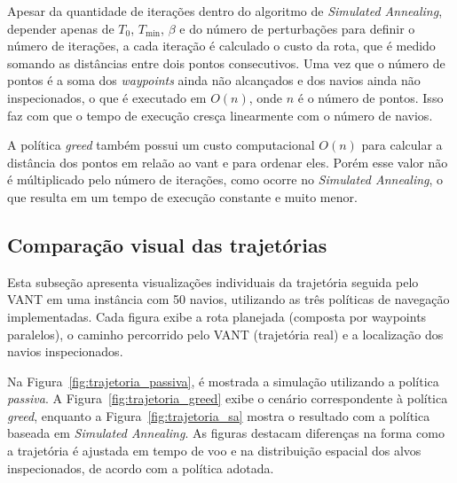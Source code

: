 Apesar da quantidade de iterações dentro do algoritmo de \textit{Simulated Annealing}, depender apenas de $T_0$, $T_{\text{min}}$, $\beta$ e do número de perturbações para definir o número de iterações, a cada iteração é calculado o custo da rota, que é medido somando as distâncias entre dois pontos consecutivos. Uma vez que o número de pontos é a soma dos \textit{waypoints} ainda não alcançados e dos navios ainda não inspecionados, o que é executado em $O(n)$, onde $n$ é o número de pontos. Isso faz com que o tempo de execução cresça linearmente com o número de navios.

A política \textit{greed} também possui um custo computacional $O(n)$ para calcular a distância dos pontos em relaão ao vant e para ordenar eles. Porém esse valor não é múltiplicado pelo número de iterações, como ocorre no \textit{Simulated Annealing}, o que resulta em um tempo de execução constante e muito menor. 

\subsection{Comparação visual das trajetórias}

Esta subseção apresenta visualizações individuais da trajetória seguida pelo VANT em uma instância com 50 navios, utilizando as três políticas de navegação implementadas. Cada figura exibe a rota planejada (composta por waypoints paralelos), o caminho percorrido pelo VANT (trajetória real) e a localização dos navios inspecionados.

Na Figura~\ref{fig:trajetoria_passiva}, é mostrada a simulação utilizando a política \textit{passiva}. A Figura~\ref{fig:trajetoria_greed} exibe o cenário correspondente à política \textit{greed}, enquanto a Figura~\ref{fig:trajetoria_sa} mostra o resultado com a política baseada em \textit{Simulated Annealing}. As figuras destacam diferenças na forma como a trajetória é ajustada em tempo de voo e na distribuição espacial dos alvos inspecionados, de acordo com a política adotada.

